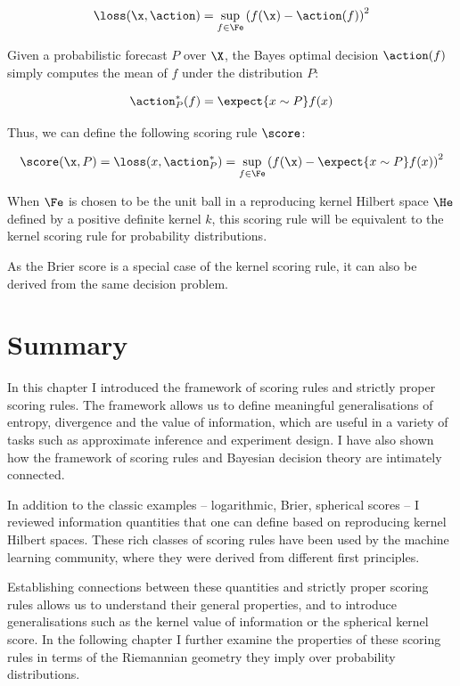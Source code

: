 \begin{equation}
\loss(\x, \action) = \sup_{f\in\Fe}\left( f(\x) - \action(f)\right)^2
\end{equation}

Given a probabilistic forecast $P$ over $\X$, the Bayes optimal decision $\action(f)$ simply computes the mean of $f$ under the distribution $P$:

\begin{equation}
 \action^{*}_{P}(f) = \expect{x\sim P} f(x)
\end{equation}

Thus, we can define the following scoring rule $\score$:

\begin{equation}
	\score(\x,P) = \loss(x,\action^{*}_{P} )
		= 	\sup_{f\in\Fe}\left( f(\x) - \expect{x\sim P} f(x) \right)^2
\end{equation}

When $\Fe$ is chosen to be the unit ball in a reproducing kernel Hilbert space $\He$ defined by a positive definite kernel $k$, this scoring rule will be equivalent to the kernel scoring rule for probability distributions.

As the Brier score is a special case of the kernel scoring rule, it can also be derived from the same decision problem.

\section{Summary}

In this chapter I introduced the framework of scoring rules and strictly proper scoring rules. The framework allows us to define meaningful generalisations of entropy, divergence and the value of information, which are useful in a variety of tasks such as approximate inference and experiment design. I have also shown how the framework of scoring rules and Bayesian decision theory are intimately connected.

In addition to the classic examples -- logarithmic, Brier, spherical scores -- I reviewed information quantities that one can define based on reproducing kernel Hilbert spaces. These rich classes of scoring rules have been used by the machine learning community, where they were derived from different first principles. 

Establishing connections between these quantities and strictly proper scoring rules allows us to understand their general properties, and to introduce generalisations such as the kernel value of information or the spherical kernel score. In the following chapter I further examine the properties of these scoring rules in terms of the Riemannian geometry they imply over probability distributions.